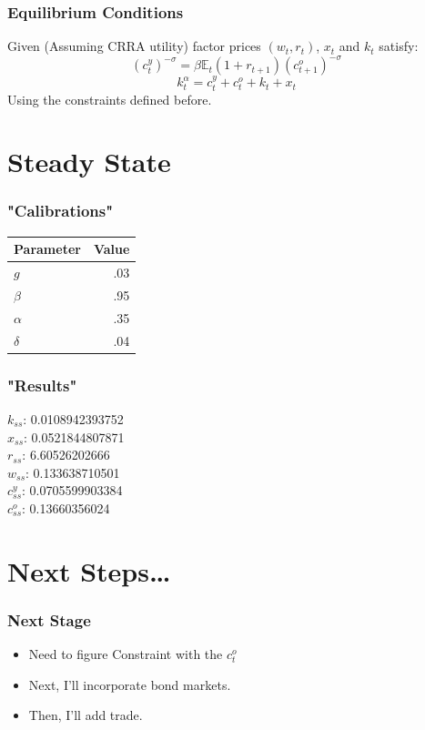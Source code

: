\documentclass[11pt]{beamer}
\theoremstyle{definition}
\begin{document}
\begin{frame}
    \frametitle{Equilibrium Conditions}
    Given (Assuming CRRA utility) factor prices $(w_t,r_t)$, $x_t$ and $k_t$ satisfy:
    \[(c_t^y)^{-\sigma}=\beta \mathds{E}_t(1+r_{t+1})(c_{t+1}^o)^{-\sigma}\]
    \[k_t^\alpha = c_t^y + c_{t}^o + k_t +x_t\]
    Using the constraints defined before.

\end{frame}

\section{Steady State} 
\begin{frame}
    \frametitle{"Calibrations"}
    \begin{table}
\begin{tabular}{lr}
\toprule
{Parameter} & Value \\
\midrule
$g$  &  .03 \\
$\beta$  &  .95 \\
$\alpha$  &  .35 \\
$\delta$  &  .04 \\
\bottomrule
\end{tabular}
\end{table}

\end{frame}

\begin{frame}
    \frametitle{"Results"}
    $k_{ss}$:  0.0108942393752\\
    $x_{ss}$:  0.0521844807871\\
    $r_{ss}$:  6.60526202666\\
    $w_{ss}$:  0.133638710501\\
    $c^y_{ss}$:  0.0705599903384\\
    $c^o_{ss}$:  0.13660356024


\end{frame}





\section{Next Steps\dots} 
\begin{frame}
    \frametitle{Next Stage}
    \begin{itemize}
        \item Need to figure Constraint with the $c_t^o$
        \item Next, I'll incorporate bond markets.
        \item Then, I'll add trade.
    \end{itemize}

\end{frame}



\end{document}
